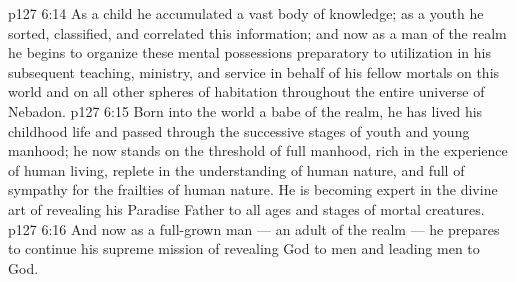 \vs p127 6:14 As a child he accumulated a vast body of knowledge; as a youth he sorted, classified, and correlated this information; and now as a man of the realm he begins to organize these mental possessions preparatory to utilization in his subsequent teaching, ministry, and service in behalf of his fellow mortals on this world and on all other spheres of habitation throughout the entire universe of Nebadon.
\vs p127 6:15 Born into the world a babe of the realm, he has lived his childhood life and passed through the successive stages of youth and young manhood; he now stands on the threshold of full manhood, rich in the experience of human living, replete in the understanding of human nature, and full of sympathy for the frailties of human nature. He is becoming expert in the divine art of revealing his Paradise Father to all ages and stages of mortal creatures.
\vs p127 6:16 And now as a full\hyp{}grown man --- an adult of the realm --- he prepares to continue his supreme mission of revealing God to men and leading men to God.
